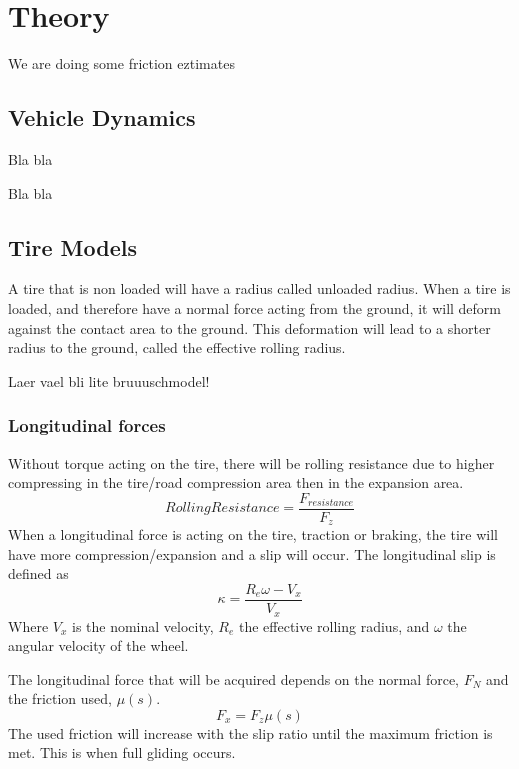 \chapter{Theory}


We are doing some friction eztimates

\section{Vehicle Dynamics}

Bla bla \cite{fordonsdynamik}

Bla bla \cite{pacejka}

\section{Tire Models}

A tire that is non loaded will have a radius called unloaded radius. When a tire is loaded, and therefore have a normal force acting from the ground, it will deform against the contact area to the ground. This deformation will lead to a shorter radius to the ground, called the effective rolling radius. 

Laer vael bli lite bruuuschmodel!

\subsection{Longitudinal forces}

Without torque acting on the tire, there will be rolling resistance due to higher compressing in the tire/road compression area then in the expansion area.
\begin{equation}
 	RollingResistance = \frac{F_{resistance}}{F_{z}}
\end{equation}
When a longitudinal force is acting on the tire, traction or braking, the tire will have more compression/expansion and a slip will occur. The longitudinal slip is defined as
\begin{equation}
	 \kappa = \dfrac{R_{e}\omega-V_{x}}{V_{x}}
\end{equation}
Where $V_{x}$ is the nominal velocity, $R_{e}$ the effective rolling radius, and $\omega$ the angular velocity of the wheel.

The longitudinal force that will be acquired depends on the normal force, $ F_{N} $ and the friction used, $ \mu(s) $.
\begin{equation}
	 F_{x} = F_{z}\mu(s)
\end{equation}
The used friction will increase with the slip ratio until the maximum friction is met. This is when full gliding occurs. 

